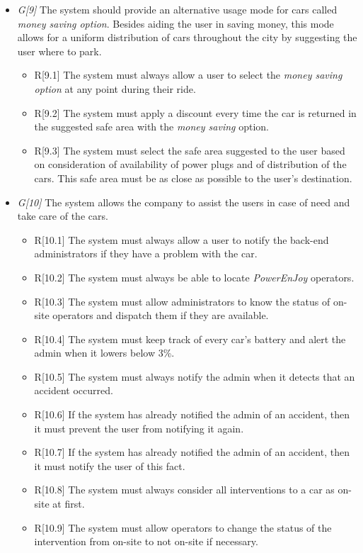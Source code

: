 \begin{itemize}
				\item \textit{G[9]} The system should provide an alternative usage mode for cars called \textit{money saving option}. Besides aiding the user in saving money, this mode allows for a uniform distribution of cars throughout the city by suggesting the user where to park.
					\begin{itemize}
						\item R[9.1] The system must always allow a user to select the \textit{money saving option} at any point during their ride. 
						\item R[9.2] The system must apply a discount every time the car is returned in the suggested safe area with the \textit{money saving} option.
						\item R[9.3] The system must select the safe area suggested to the user based on consideration of availability of power plugs and of distribution of the cars. This safe area must be as close as possible to the user's destination. %
					\end{itemize}
					
				\item \textit{G[10]} The system allows the company to assist the users in case of need and take care of the cars.	
					\begin{itemize}
						\item R[10.1] The system must always allow a user to notify the back-end administrators if they have a problem with the car.
						\item R[10.2] The system must always be able to locate \textit{PowerEnJoy} operators. 
						\item R[10.3] The system must allow administrators to know the status of on-site operators and dispatch them if they are available.
						\item R[10.4] The system must keep track of every car's battery and alert the admin when it lowers below 3\%. 
						\item R[10.5] The system must always notify the admin when it detects that an accident occurred. 
						\item R[10.6] If the system has already notified the admin of an accident, then it must prevent the user from notifying it again.
						\item R[10.7] If the system has already notified the admin of an accident, then it must notify the user of this fact.
						\item R[10.8] The system must always consider all interventions to a car as on-site at first.
						\item R[10.9] The system must allow operators to change the status of the intervention from on-site to not on-site if necessary.
					\end{itemize}
					

\end{itemize}
